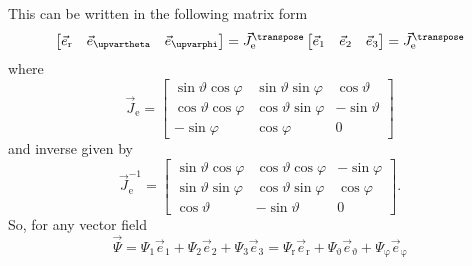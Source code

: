 This can be written in the following matrix form
\begin{equation}
\label{Eq1:XtoSpherical}
	\begin{bmatrix}
		\vec{e}_{\mathrm{r}} & \vec{e}_{\upvartheta} & \vec{e}_{\upvarphi}
	\end{bmatrix} = \vec{J}_{\mathrm{e}}^\transpose\begin{bmatrix}
		\vec{e}_1 & \vec{e}_2 & \vec{e}_3
	\end{bmatrix} = \vec{J}_{\mathrm{e}}^\transpose
\end{equation}
where
\begin{equation}
	\vec{J}_{\mathrm{e}} = \begin{bmatrix}
		\sin\vartheta\cos\varphi & \sin\vartheta\sin\varphi & \cos\vartheta\\
		\cos\vartheta\cos\varphi & \cos\vartheta\sin\varphi & -\sin\vartheta\\
		-\sin\varphi & \cos\varphi & 0
	\end{bmatrix}
\end{equation}
and inverse given by
\begin{equation}
	\vec{J}_{\mathrm{e}}^{-1} = \begin{bmatrix}
		\sin\vartheta\cos\varphi & \cos\vartheta\cos\varphi & -\sin\varphi\\
		\sin\vartheta\sin\varphi & \cos\vartheta\sin\varphi & \cos\varphi\\
		\cos\vartheta & -\sin\vartheta & 0
	\end{bmatrix}.
\end{equation}
So, for any vector field
\begin{equation}
	\vec{\Psi} = \Psi_1\vec{e}_1 + \Psi_2\vec{e}_2  + \Psi_3\vec{e}_3 = \Psi_{\mathrm{r}}\vec{e}_{\mathrm{r}} + \Psi_{\upvartheta}\vec{e}_{\upvartheta} + \Psi_{\upvarphi}\vec{e}_{\upvarphi} 
\end{equation}
